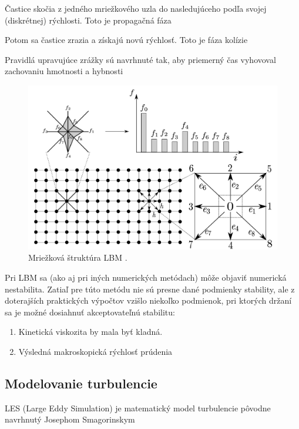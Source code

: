 \documentclass[]{tukediphc}
\begin{document}
Častice skočia z jedného mriežkového uzla do nasledujúceho podľa svojej (diskrétnej) rýchlosti. Toto je propagačná fáza

Potom sa častice zrazia a získajú novú rýchlosť. Toto je fáza kolízie

Pravidlá upravujúce zrážky sú navrhnuté tak, aby priemerný čas vyhovoval zachovaniu hmotnosti a hybnosti

\begin{figure}[!ht]
	\centering
	\includegraphics[width=.7\textwidth,angle=0]{figures/lbm-grid.jpg}
	\caption{Mriežková štruktúra LBM \citep{Soga2020}.}
\end{figure}

Pri LBM sa (ako aj pri iných numerických metódach) môže objaviť numerická nestabilita. Zatiaľ pre túto metódu nie sú presne dané podmienky stability, ale z doterajších praktických výpočtov vzišlo niekoľko podmienok, pri ktorých držaní sa je možné dosiahnuť akceptovateľnú stabilitu:

\begin{enumerate}
	\item{Kinetická viskozita by mala byť kladná.}
	\item{Výsledná makroskopická rýchlosť prúdenia}
\end{enumerate}


\subsection{Modelovanie turbulencie}

LES (Large Eddy Simulation) je matematický model turbulencie pôvodne navrhnutý Josephom Smagorinskym
\end{document}
